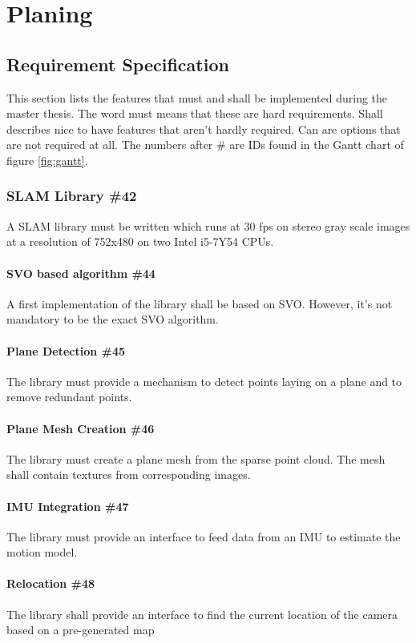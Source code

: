\documentclass[11pt,a4paper,titlepage,oneside]{report}
\begin{document}
\chapter{Planing}

\section{Requirement Specification}

This section lists the features that must and shall be implemented during the master thesis. The word must means that these are hard requirements. Shall describes nice to have features that aren't hardly required. Can are options that are not required at all. The numbers after \# are IDs found in the Gantt chart of figure \ref{fig:gantt}.

\subsection{SLAM Library \#42}
A SLAM library must be written which runs at 30 fps on stereo gray scale images at a resolution of 752x480 on two Intel i5-7Y54 CPUs.
\subsubsection{SVO based algorithm \#44}
A first implementation of the library shall be based on SVO. However, it's not mandatory to be the exact SVO algorithm.
\subsubsection{Plane Detection \#45}
The library must provide a mechanism to detect points laying on a plane and to remove redundant points.
\subsubsection{Plane Mesh Creation \#46}
The library must create a plane mesh from the sparse point cloud. The mesh shall contain textures from corresponding images.
\subsubsection{IMU Integration \#47}
The library must provide an interface to feed data from an IMU to estimate the motion model.
\subsubsection{Relocation \#48}
The library shall provide an interface to find the current location of the camera based on a pre-generated map
\end{document}

